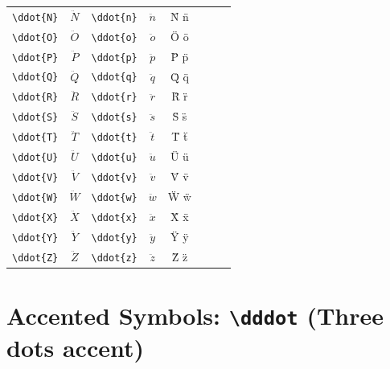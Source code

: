\documentclass[12pt,a4paper]{article}
\begin{document}
\begin{longtable}{|l|c|l|c|c|l|c|c|}
\verb|\ddot{N}| & $\ddot{N}$      & \verb|\ddot{n}| & $\ddot{n}$      & N̈ n̈            &                 &                 & \\
\verb|\ddot{O}| & $\ddot{O}$      & \verb|\ddot{o}| & $\ddot{o}$      & Ö ö            &                 &                 & \\
\verb|\ddot{P}| & $\ddot{P}$      & \verb|\ddot{p}| & $\ddot{p}$      & P̈ p̈            &                 &                 & \\
\verb|\ddot{Q}| & $\ddot{Q}$      & \verb|\ddot{q}| & $\ddot{q}$      & Q̈ q̈            &                 &                 & \\
\verb|\ddot{R}| & $\ddot{R}$      & \verb|\ddot{r}| & $\ddot{r}$      & R̈ r̈            &                 &                 & \\
\verb|\ddot{S}| & $\ddot{S}$      & \verb|\ddot{s}| & $\ddot{s}$      & S̈ s̈            &                 &                 & \\
\verb|\ddot{T}| & $\ddot{T}$      & \verb|\ddot{t}| & $\ddot{t}$      & T̈ ẗ            &                 &                 & \\
\verb|\ddot{U}| & $\ddot{U}$      & \verb|\ddot{u}| & $\ddot{u}$      & Ü ü            &                 &                 & \\
\verb|\ddot{V}| & $\ddot{V}$      & \verb|\ddot{v}| & $\ddot{v}$      & V̈ v̈            &                 &                 & \\
\verb|\ddot{W}| & $\ddot{W}$      & \verb|\ddot{w}| & $\ddot{w}$      & Ẅ ẅ            &                 &                 & \\
\verb|\ddot{X}| & $\ddot{X}$      & \verb|\ddot{x}| & $\ddot{x}$      & Ẍ ẍ            &                 &                 & \\
\verb|\ddot{Y}| & $\ddot{Y}$      & \verb|\ddot{y}| & $\ddot{y}$      & Ÿ ÿ            &                 &                 & \\
\verb|\ddot{Z}| & $\ddot{Z}$      & \verb|\ddot{z}| & $\ddot{z}$      & Z̈ z̈            &                 &                 & \\
\hline
\end{longtable}

\newpage

\section*{Accented Symbols: \texttt{\textbackslash dddot} (Three dots accent)}
\end{document}
